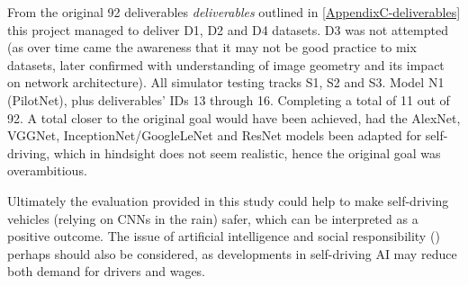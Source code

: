 
From the original 92 deliverables \textit{deliverables} outlined in \ref{AppendixC-deliverables} this project managed to deliver D1, D2 and D4 datasets. D3 was not attempted (as over time came the awareness that it may not be good practice to mix datasets, later confirmed with understanding of image geometry and its impact on network architecture). All simulator testing tracks S1, S2 and S3. Model N1 (PilotNet), plus deliverables' IDs 13 through 16. Completing a total of 11 out of 92. A total closer to the original goal would have been achieved, had the AlexNet, VGGNet, InceptionNet/GoogleLeNet and ResNet models been adapted for self-driving, which in hindsight does not seem realistic, hence the original goal was overambitious.

Ultimately the evaluation provided in this study could help to make self-driving vehicles (relying on CNNs in the rain) safer, which can be interpreted as a positive outcome. The issue of artificial intelligence and social responsibility (\cite{saveliev2020artificial}) perhaps should also be considered, as developments in self-driving AI may reduce both demand for drivers and wages.




